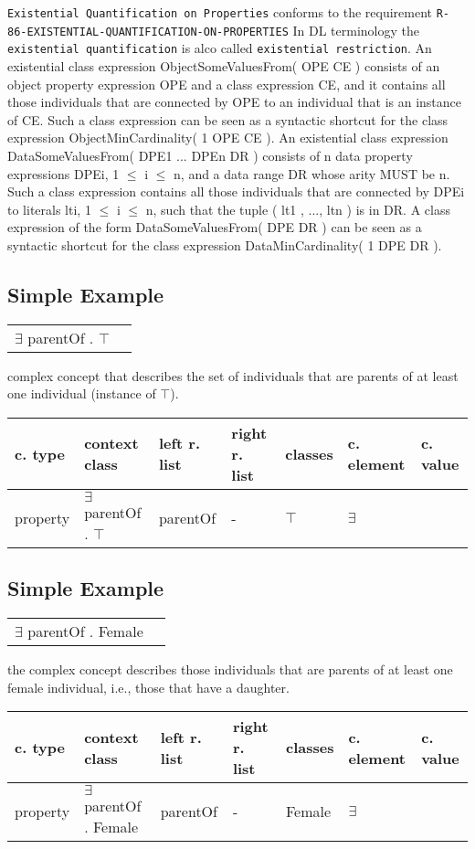 \documentclass{llncs}
\newcommand{\ms}[1]{\texttt{#1}}
\newenvironment{gcotable}{
  \scriptsize
  \sffamily
  \vspace{0.3cm}
	\begin{center}
  \begin{tabular}{l|l|l|l|l|l|l}
  \hline
  \textbf{c. type} & \textbf{context class} & \textbf{left r. list} & \textbf{right r. list} & \textbf{classes} & \textbf{c. element} & \textbf{c. value} \\
  \hline

}{
  \hline
  \end{tabular}
	\end{center}
}
\newenvironment{DL}{
	\begin{center}
  \begin{tabular}{r l}

}{
  \end{tabular}
	\end{center}
}
\begin{document}
\ms{Existential Quantification on Properties} conforms to the requirement \ms{R-86-EXISTENTIAL-QUANTIFICATION-ON-PROPERTIES}
In DL terminology the \ms{existential quantification} is alco called \ms{existential restriction}.
An existential class expression ObjectSomeValuesFrom( OPE CE ) consists of an object property expression OPE and a class expression CE, and it contains all those individuals that are connected by OPE to an individual that is an instance of CE. Such a class expression can be seen as a syntactic shortcut for the class expression ObjectMinCardinality( 1 OPE CE ).
An existential class expression DataSomeValuesFrom( DPE1 ... DPEn DR ) consists of n data property expressions DPEi, 1 $\leq$ i $\leq$ n, and a data range DR whose arity MUST be n. Such a class expression contains all those individuals that are connected by DPEi to literals lti, 1 $\leq$ i $\leq$ n, such that the tuple ( lt1 , ..., ltn ) is in DR. A class expression of the form DataSomeValuesFrom( DPE DR ) can be seen as a syntactic shortcut for the class expression DataMinCardinality( 1 DPE DR ). 

\subsection{Simple Example}

\begin{DL}
$\exists$ parentOf . $\top$
\end{DL}

complex concept that describes the set
of individuals that are parents of at least one individual (instance of $\top$). 

\begin{gcotable}
property & $\exists$ parentOf . $\top$ & parentOf & - & $\top$ & $\exists$ \\
\end{gcotable}

\subsection{Simple Example}

\begin{DL}
$\exists$ parentOf . Female
\end{DL}

the complex concept describes those individuals that are parents of at least one
female individual, i.e., those that have a daughter.

\begin{gcotable}
property & $\exists$ parentOf . Female & parentOf & - & Female & $\exists$ \\
\end{gcotable}
\end{document}

